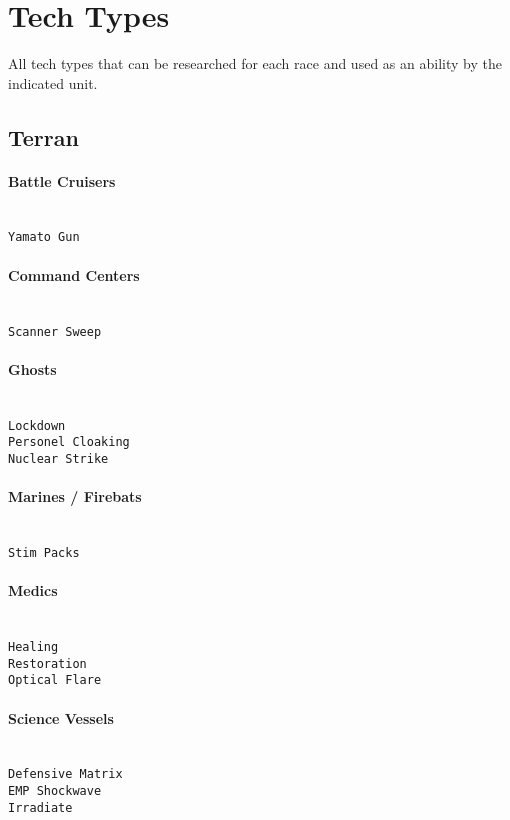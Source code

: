 \newpage
\section{Tech Types}
\label{techtype}
All tech types that can be researched for each race and used as an ability by the indicated unit.

\subsection{Terran}

\paragraph{Battle Cruisers} \mbox{}\\
\verb|Yamato Gun|

\paragraph{Command Centers} \mbox{}\\
\verb|Scanner Sweep| 

\paragraph{Ghosts} \mbox{}\\
\verb|Lockdown| \\
\verb|Personel Cloaking| \\
\verb|Nuclear Strike|

\paragraph{Marines / Firebats} \mbox{}\\
\verb|Stim Packs|

\paragraph{Medics} \mbox{}\\
\verb|Healing| \\
\verb|Restoration| \\
\verb|Optical Flare|

\paragraph{Science Vessels} \mbox{}\\
\verb|Defensive Matrix| \\
\verb|EMP Shockwave| \\
\verb|Irradiate| 

